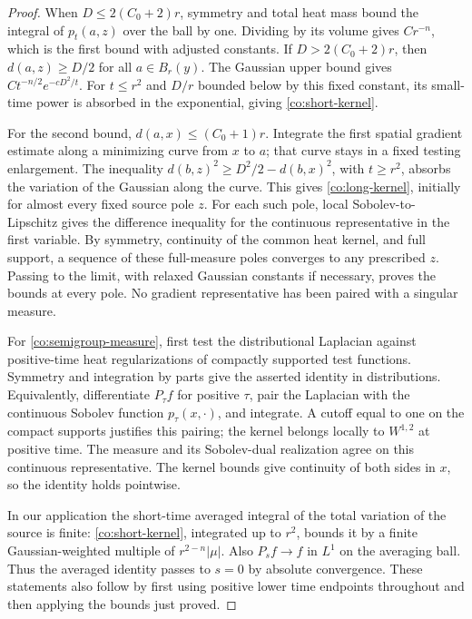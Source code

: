 \begin{proof}
When \(D\le 2(C_0+2)r\), symmetry and total heat mass bound the
integral of \(p_t(a,z)\) over the ball by one.  Dividing by its
volume gives \(Cr^{-n}\), which is the first bound with adjusted
constants.  If \(D>2(C_0+2)r\), then \(d(a,z)\ge D/2\) for all
\(a\in B_r(y)\).  The Gaussian upper bound gives
\(Ct^{-n/2}e^{-cD^2/t}\).  For \(t\le r^2\) and \(D/r\) bounded
below by this fixed constant, its small-time power is absorbed
in the exponential, giving \eqref{co:short-kernel}.

For the second bound, \(d(a,x)\le(C_0+1)r\).  Integrate the first
spatial gradient estimate along a minimizing curve from \(x\) to
\(a\); that curve stays in a fixed testing enlargement.  The
inequality
\(d(b,z)^2\ge D^2/2-d(b,x)^2\), with \(t\ge r^2\), absorbs the
variation of the Gaussian along the curve.  This gives
\eqref{co:long-kernel}, initially for almost every fixed source
pole \(z\).  For each such pole, local Sobolev-to-Lipschitz gives
the difference inequality for the continuous representative in
the first variable.  By symmetry, continuity of the common heat
kernel, and full support, a sequence of these full-measure poles
converges to any prescribed \(z\).  Passing to the limit, with
relaxed Gaussian constants if necessary, proves the bounds at
every pole.  No gradient representative has been paired with a
singular measure.

For \eqref{co:semigroup-measure}, first test the distributional
Laplacian against positive-time heat regularizations of compactly
supported test functions.  Symmetry and integration by parts give
the asserted identity in distributions.  Equivalently, differentiate
\(P_\tau f\) for positive \(\tau\), pair the Laplacian with the
continuous Sobolev function \(p_\tau(x,\cdot)\), and integrate.
A cutoff equal to one on the compact supports justifies this
pairing; the kernel belongs locally to \(W^{1,2}\) at positive
time.  The measure and its Sobolev-dual realization agree on this
continuous representative.  The kernel bounds give continuity of
both sides in \(x\), so the identity holds pointwise.

In our application the short-time averaged integral of the total
variation of the source is finite: \eqref{co:short-kernel},
integrated up to \(r^2\), bounds it by a finite Gaussian-weighted
multiple of \(r^{2-n}|\mu|\).  Also \(P_s f\to f\) in \(L^1\)
on the averaging ball.  Thus the averaged identity passes to
\(s=0\) by absolute convergence.  These statements also follow
by first using positive lower time endpoints throughout and then
applying the bounds just proved.
\end{proof}

